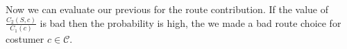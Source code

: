 Now we can evaluate our previous for the route contribution. If the value of $\frac{C_2(S,c)}{C_1(c)}$ is bad then the probability is high, the we made a bad route choice for costumer $c\in\mathcal{C}$.

